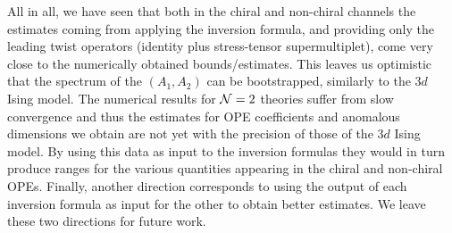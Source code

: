 \bigskip

All in all, we have seen that both in the chiral and non-chiral channels the estimates coming from applying the inversion formula, and providing only the leading twist operators (identity plus stress-tensor supermultiplet), come very close to the numerically obtained bounds/estimates. This leaves us optimistic that the spectrum of the $(A_1,A_2)$ can be bootstrapped, similarly to the $3d$ Ising model. The numerical results for ${\mathcal{N}}=2$ theories suffer from slow convergence and thus the estimates for OPE coefficients and anomalous dimensions we obtain are not yet with the precision of those of the $3d$ Ising model. By using this data as input to the inversion formulas they would in turn produce ranges for the various quantities appearing in the chiral and non-chiral OPEs.
Finally, another direction corresponds to using the output of each inversion formula as input for the other to obtain better estimates. We leave these two directions for future work.